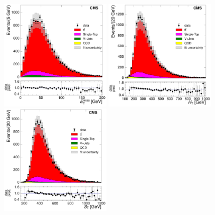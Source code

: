 \begin{figure}[hbtp]
    \centering
     \includegraphics[width=0.48\textwidth]{Chapters/04_Analysis/04b_XSections/images/control_plots/after_fit/7TeV/MuPlusJets_patType1CorrectedPFMet_2orMoreBtags_with_ratio.pdf}\hfill    
     \includegraphics[width=0.48\textwidth]{Chapters/04_Analysis/04b_XSections/images/control_plots/after_fit/7TeV/MuPlusJets_HT_2orMoreBtags_with_ratio.pdf}\\                            
     \includegraphics[width=0.48\textwidth]{Chapters/04_Analysis/04b_XSections/images/control_plots/after_fit/7TeV/MuPlusJets_patType1CorrectedPFMet_ST_2orMoreBtags_with_ratio.pdf}\hfill 

\end{figure}
